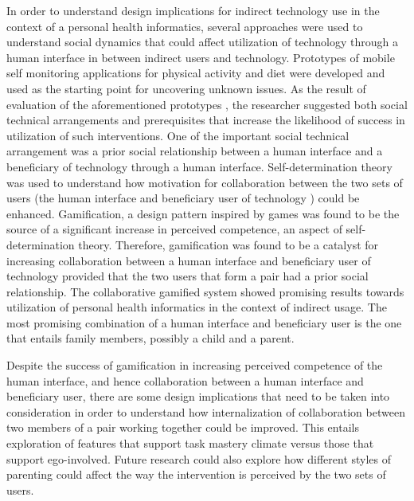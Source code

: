 \documentclass[11pt, oneside]{Thesis} %
\begin{document}
{In order to understand design implications for indirect technology use in the context of a personal health informatics, several approaches were used to understand social dynamics that could affect utilization of technology through a human interface in between indirect users and technology. Prototypes of mobile self monitoring applications for physical activity and diet were developed and used as the starting point for uncovering unknown issues. As the result of evaluation of the aforementioned prototypes , the researcher suggested both social technical arrangements and prerequisites that increase the likelihood of success in utilization of such interventions. One of the important social technical arrangement was a prior social relationship between a human interface and a beneficiary of technology through a human interface. Self-determination theory was used to understand how motivation for collaboration between the two sets of users (the human interface and beneficiary user of technology ) could be enhanced. Gamification, a design pattern inspired by games  was found to be the source of a significant increase in perceived competence, an aspect of self-determination theory. Therefore, gamification was found to be a catalyst for increasing collaboration between a human interface and beneficiary user of technology provided that the two users that form a pair had a prior social relationship. The collaborative gamified system showed promising results towards utilization of personal health informatics in the context of indirect usage. The most promising combination of a human interface and beneficiary user is the one that entails family members, possibly a child and a parent.

Despite the success of gamification in increasing perceived competence of the human interface, and hence collaboration between a human interface and beneficiary user, there are some design implications that need to be taken into consideration in order to understand how internalization of collaboration between two members of a pair working together could be improved. This entails exploration of features that support task mastery climate versus those that support ego-involved. Future research could also explore how different styles of parenting could affect the way the intervention is perceived by the two sets of users.
}

\clearpage %

\end{document}
